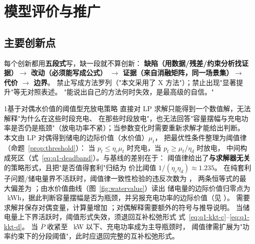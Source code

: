 
\section{模型评价与推广}

\subsection{主要创新点}

\begin{guideblock}
每个创新都用\textbf{五段式}写，缺一段就不算创新：
\textbf{缺陷（用数据/残差/约束分析找证据）\(\rightarrow\) 改动（必须能写成公式）
\(\rightarrow\) 证据（来自消融矩阵，同一场景集）\(\rightarrow\) 代价 \(\rightarrow\) 边界}。
禁止写成方法罗列（"本文采用了 X 方法"）；禁止出现"显著提升"等无对照表述。
"能说出自己的方法何时失效，是最高级的自信。"
\end{guideblock}

\begin{innovation}{1}{基于对偶水价值的阈值型充放电策略}
直接对 LP 求解只能得到一个数值解，无法解释"为什么在这些时段充电、
在那些时段放电"，也无法回答"容量摆幅与充电功率是否仍是瓶颈"（放电功率不紧）；当参数变化时需要重新求解才能给出判断。
本文由 LP 对偶得到储电的边际价值（水价值）\(\mu_t\)，
把最优性条件整理为阈值律（命题~\ref{prop:threshold}）：
当 \(p_t\le\eta_c\mu_{t}\) 时充电，当 \(p_t\ge\mu_{t}/\eta_d\) 时放电，
中间构成死区（式~\eqref{eq:q1-deadband}）。与基线的差别在于：
阈值律给出了\textbf{与求解器无关}的策略形式，且把"是否值得套利"归结为
价比阈值 \(1/(\eta_c\eta_d)\approx1.235\)。
在纯套利子问题/储电量界不活跃时，阈值律一致性检验的违反次数为 \ph，
两条恒等式的最大偏差为 \ph；由水价值曲线（图~\ref{fig:watervalue}）读出
储电量的边际价值归零点为 \ph~kWh，据此判断容量摆幅是否为瓶颈，并另报充电功率的边际价值（见 ）。
需要求解并保存对偶变量，计算量增加 \ph；对偶解释需要额外的符号与推导说明。
当储电量上下界活跃时，阈值形式失效，须退回互补松弛形式
式~\eqref{eq:q1-kkt-c}--\eqref{eq:q1-kkt-d}。
当 \(\overline P\) 收紧至 \ph~kW 以下、充电功率成为主导瓶颈时，
阈值律需扩展为"功率约束下的分段阈值"，此时应退回完整的互补松弛形式。
\end{innovation}


